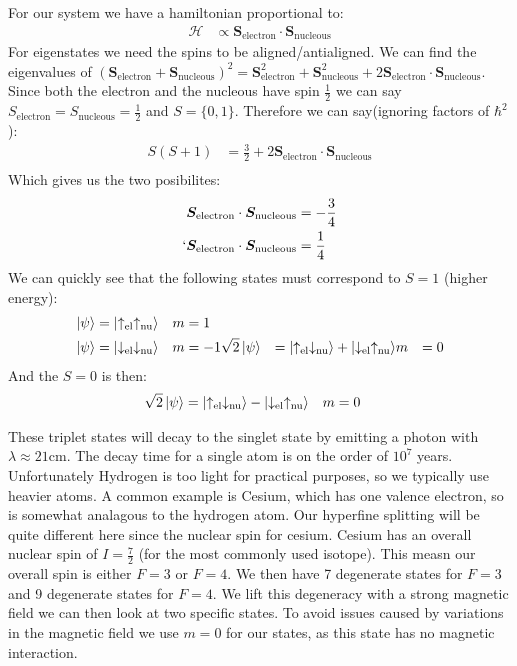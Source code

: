 For our system we have a hamiltonian proportional to:
\begin{align*}
	\mathcal{H} &\propto \bm{S}_\text{electron} \cdot\bm{S}_\text{nucleous}
\end{align*}
For eigenstates we need the spins to be aligned/antialigned. We can find the eigenvalues of $(\bm{S}_\text{electron} + \bm{S}_\text{nucleous})^2 = \bm{S}^2_\text{electron} + \bm{S}^2_\text{nucleous} + 2\bm{S}_\text{electron}\cdot\bm{S}_\text{nucleous}$. 
Since both the electron and the nucleous have spin $\frac{1}{2}$ we can say $S_\text{electron} = S_\text{nucleous} = \frac{1}{2}$ and $S = \{0,1\}$. Therefore we can say(ignoring factors of $\hbar^2$):
\begin{align*}
	S(S+1) &= \frac{3}{2} + 2\bm{S}_\text{electron}\cdot\bm{S}_\text{nucleous} \\
\end{align*}
Which gives us the two posibilites:
\begin{align*}
	\bm{S}_\text{electron}\cdot\bm{S}_\text{nucleous} &= -\frac{3}{4} \\`
	\bm{S}_\text{electron}\cdot\bm{S}_\text{nucleous} &= \frac{1}{4}
\end{align*}
We can quickly see that the following states must correspond to $S=1$ (higher energy):
\begin{align*}
	\ket{\psi} &= \ket{\uparrow_\text{el} \uparrow_\text{nu}} & m &= 1 \\ 
	\ket{\psi} &= \ket{\downarrow_\text{el}\downarrow_\text{nu}} & m &= -1
	\sqrt{2}\ket{\psi} &= \ket{\uparrow_\text{el} \downarrow_\text{nu}} + \ket{\downarrow_\text{el} \uparrow_\text{nu}} & m &= 0
\end{align*}
And the $S=0$ is then:
\begin{align*}
	\sqrt{2}\ket{\psi} &= \ket{\uparrow_\text{el} \downarrow_\text{nu}} - \ket{\downarrow_\text{el} \uparrow_\text{nu}} & m &= 0
\end{align*}

These triplet states will decay to the singlet state by emitting a photon with $\lambda \approx 21\text{cm}$. The decay time for a single atom is on the order of $10^7$ years.
Unfortunately Hydrogen is too light for practical purposes, so we typically use heavier atoms. A common example is Cesium, which has one valence electron, so is somewhat analagous to the hydrogen atom.
Our hyperfine splitting will be quite different here since the nuclear spin for cesium. Cesium has an overall nuclear spin of $I = \frac{7}{2}$ (for the most commonly used isotope).
This measn our overall spin is either $F=3$ or $F=4$. We then have 7 degenerate states for $F=3$ and 9 degenerate states for $F=4$. We lift this degeneracy with a strong magnetic field we can then look at two specific states.
To avoid issues caused by variations in the magnetic field we use $m=0$ for our states, as this state has no magnetic interaction.

